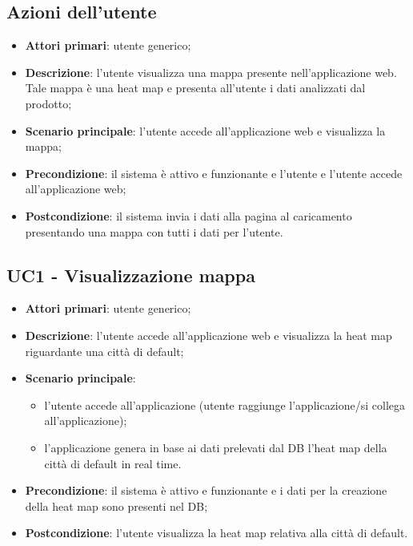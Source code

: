 \subsection{Azioni dell'utente}
\begin{itemize}
	\item \textbf{Attori primari}: utente generico;
	\item \textbf{Descrizione}: l'utente visualizza una mappa presente nell'applicazione web. Tale mappa è una heat map e presenta all'utente i dati analizzati dal prodotto;
	\item \textbf{Scenario principale}: l'utente accede all'applicazione web e visualizza la mappa;
	\item \textbf{Precondizione}: il sistema è attivo e funzionante e l'utente e l'utente accede all'applicazione web;
	\item \textbf{Postcondizione}: il sistema invia i dati alla pagina al caricamento presentando una mappa con tutti i dati per l'utente.
\end{itemize}

\subsection{UC1 - Visualizzazione mappa}
\begin{itemize}
\item \textbf{Attori primari}: utente generico;
\item \textbf{Descrizione}: l’utente accede all’applicazione web e visualizza la heat map riguardante una città di default;
\item \textbf{Scenario principale}: 
	\begin{itemize}
		\item l’utente accede all’applicazione (utente raggiunge l’applicazione/si collega all’applicazione);
		\item l’applicazione genera in base ai dati prelevati dal DB l’heat map della città di default in real time.
	\end{itemize}
\item \textbf{Precondizione}: il sistema è attivo e funzionante e i dati per la creazione della heat map sono presenti nel DB;
\item \textbf{Postcondizione}: l’utente visualizza la heat map relativa alla città di default.
\end{itemize}

